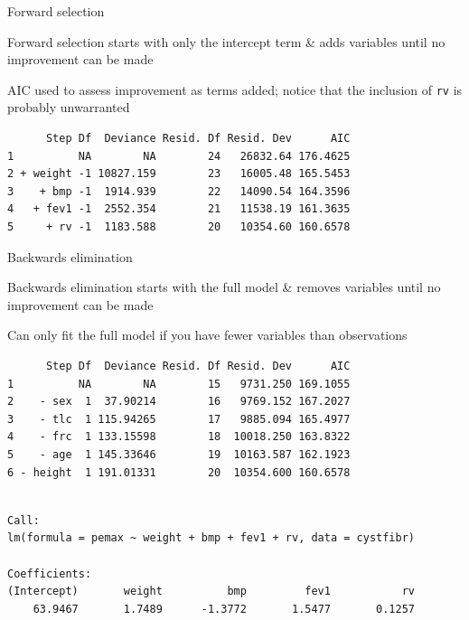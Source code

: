 \documentclass[10pt,ignorenonframetext,compress, aspectratio=169]{beamer}
\begin{document}
\begin{frame}[fragile]{Forward selection}

\alert{Forward selection} starts with only the intercept term \& adds
variables until no improvement can be made

AIC used to assess improvement as terms added; notice that the inclusion
of \texttt{rv} is probably unwarranted

\scriptsize

\begin{verbatim}
      Step Df  Deviance Resid. Df Resid. Dev      AIC
1          NA        NA        24   26832.64 176.4625
2 + weight -1 10827.159        23   16005.48 165.5453
3    + bmp -1  1914.939        22   14090.54 164.3596
4   + fev1 -1  2552.354        21   11538.19 161.3635
5     + rv -1  1183.588        20   10354.60 160.6578
\end{verbatim}

\normalsize

\end{frame}

\begin{frame}[fragile]{Backwards elimination}

\alert{Backwards elimination} starts with the full model \& removes
variables until no improvement can be made

Can only fit the full model if you have fewer variables than
observations

\scriptsize

\begin{verbatim}
      Step Df  Deviance Resid. Df Resid. Dev      AIC
1          NA        NA        15   9731.250 169.1055
2    - sex  1  37.90214        16   9769.152 167.2027
3    - tlc  1 115.94265        17   9885.094 165.4977
4    - frc  1 133.15598        18  10018.250 163.8322
5    - age  1 145.33646        19  10163.587 162.1923
6 - height  1 191.01331        20  10354.600 160.6578
\end{verbatim}

\begin{verbatim}

Call:
lm(formula = pemax ~ weight + bmp + fev1 + rv, data = cystfibr)

Coefficients:
(Intercept)       weight          bmp         fev1           rv  
    63.9467       1.7489      -1.3772       1.5477       0.1257  
\end{verbatim}

\normalsize

\end{frame}
\end{document}
